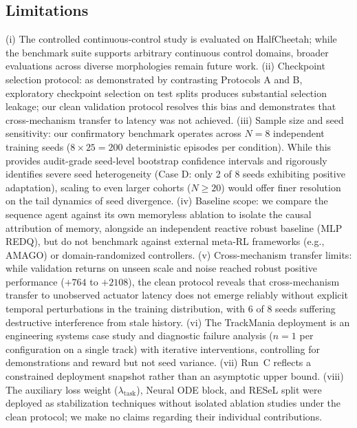 \documentclass[conference]{IEEEtran}
\begin{document}
\subsection{Limitations}
\label{sec:limitations}
(i) The controlled continuous-control study is evaluated on HalfCheetah; while the benchmark suite supports arbitrary continuous control domains, broader evaluations across diverse morphologies remain future work. (ii) Checkpoint selection protocol: as demonstrated by contrasting Protocols A and B, exploratory checkpoint selection on test splits produces substantial selection leakage; our clean validation protocol resolves this bias and demonstrates that cross-mechanism transfer to latency was not achieved. (iii) Sample size and seed sensitivity: our confirmatory benchmark operates across $N=8$ independent training seeds ($8 \times 25 = 200$ deterministic episodes per condition). While this provides audit-grade seed-level bootstrap confidence intervals and rigorously identifies severe seed heterogeneity (Case D: only 2 of 8 seeds exhibiting positive adaptation), scaling to even larger cohorts ($N \ge 20$) would offer finer resolution on the tail dynamics of seed divergence. (iv) Baseline scope: we compare the sequence agent against its own memoryless ablation to isolate the causal attribution of memory, alongside an independent reactive robust baseline (MLP REDQ), but do not benchmark against external meta-RL frameworks (e.g., AMAGO) or domain-randomized controllers. (v) Cross-mechanism transfer limits: while validation returns on unseen scale and noise reached robust positive performance ($+764$ to $+2108$), the clean protocol reveals that cross-mechanism transfer to unobserved actuator latency does not emerge reliably without explicit temporal perturbations in the training distribution, with 6 of 8 seeds suffering destructive interference from stale history. (vi) The TrackMania deployment is an engineering systems case study and diagnostic failure analysis ($n=1$ per configuration on a single track) with iterative interventions, controlling for demonstrations and reward but not seed variance. (vii) Run~C reflects a constrained deployment snapshot rather than an asymptotic upper bound. (viii) The auxiliary loss weight ($\lambda_{\text{task}}$), Neural ODE block, and RESeL split were deployed as stabilization techniques without isolated ablation studies under the clean protocol; we make no claims regarding their individual contributions.
\end{document}
